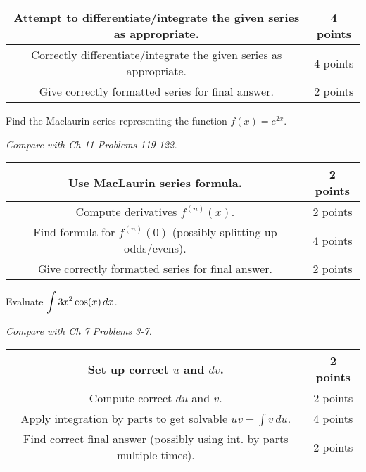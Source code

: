 \documentclass[12pt]{exam}
\newcommand{\ds}{\ensuremath{\displaystyle}}
\begin{document}
\begin{questions}
\begin{center}
  \begin{tabular}{|c|c|}
    \hline
    Attempt to differentiate/integrate the given series as appropriate.
    & 4 points \\
    \hline
    Correctly differentiate/integrate the given series as appropriate.
    & 4 points \\
    \hline
    Give correctly formatted series for final answer. & 2 points \\
    \hline
  \end{tabular}
\end{center}

\vfill

\newpage

\question[10]
Find the Maclaurin series representing the function $f(x)=e^{2x}$.

\textit{Compare with Ch 11 Problems 119-122.}

\begin{center}
  \begin{tabular}{|c|c|}
    \hline
    Use MacLaurin series formula. & 2 points \\
    \hline
    Compute derivatives $f^{(n)}(x)$. & 2 points \\
    \hline
    Find formula for $f^{(n)}(0)$ (possibly splitting up odds/evens).
    & 4 points \\
    \hline
    Give correctly formatted series for final answer. & 2 points \\
    \hline
  \end{tabular}
\end{center}

\vfill

\newpage

\question[10]
Evaluate $\ds\int 3x^2\cos(x)\,dx$.

\textit{Compare with Ch 7 Problems 3-7.}

\begin{center}
  \begin{tabular}{|c|c|}
    \hline
    Set up correct $u$ and $dv$. & 2 points \\
    \hline
    Compute correct $du$ and $v$. & 2 points \\
    \hline
    Apply integration by parts to get solvable $uv-\int v\,du$. & 4 points \\
    \hline
    Find correct final answer (possibly using int. by parts
    multiple times). & 2 points \\
    \hline
  \end{tabular}
\end{center}


\end{questions}
\end{document}
